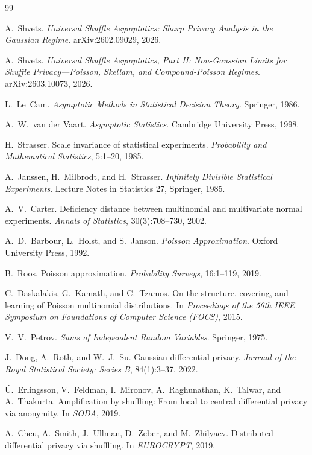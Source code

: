 \documentclass{article}
\newcommand{\1}{\mathbf 1}
\begin{document}
\begingroup
\sloppy
{}
\begin{thebibliography}{99}

A.~Shvets.
\textit{Universal Shuffle Asymptotics: Sharp Privacy Analysis in the Gaussian Regime}.
arXiv:2602.09029, 2026.

A.~Shvets.
\textit{Universal Shuffle Asymptotics, Part II: Non-Gaussian Limits for Shuffle Privacy---Poisson, Skellam, and Compound-Poisson Regimes}.
arXiv:2603.10073, 2026.

L.~Le~Cam.
\textit{Asymptotic Methods in Statistical Decision Theory}.
Springer, 1986.

A.~W.~van der Vaart.
\textit{Asymptotic Statistics}.
Cambridge University Press, 1998.

H.~Strasser.
Scale invariance of statistical experiments.
\textit{Probability and Mathematical Statistics}, 5:1--20, 1985.

A.~Janssen, H.~Milbrodt, and H.~Strasser.
\textit{Infinitely Divisible Statistical Experiments}.
Lecture Notes in Statistics 27, Springer, 1985.

A.~V.~Carter.
Deficiency distance between multinomial and multivariate normal experiments.
\textit{Annals of Statistics}, 30(3):708--730, 2002.

A.~D.~Barbour, L.~Holst, and S.~Janson.
\textit{Poisson Approximation}.
Oxford University Press, 1992.

B.~Roos.
Poisson approximation.
\textit{Probability Surveys}, 16:1--119, 2019.

C.~Daskalakis, G.~Kamath, and C.~Tzamos.
On the structure, covering, and learning of Poisson multinomial distributions.
In \textit{Proceedings of the 56th IEEE Symposium on Foundations of Computer Science (FOCS)}, 2015.

V.~V.~Petrov.
\textit{Sums of Independent Random Variables}.
Springer, 1975.

J.~Dong, A.~Roth, and W.~J.~Su.
Gaussian differential privacy.
\textit{Journal of the Royal Statistical Society: Series B}, 84(1):3--37, 2022.

\'U.~Erlingsson, V.~Feldman, I.~Mironov, A.~Raghunathan, K.~Talwar, and A.~Thakurta.
Amplification by shuffling: From local to central differential privacy via anonymity.
In \textit{SODA}, 2019.

A.~Cheu, A.~Smith, J.~Ullman, D.~Zeber, and M.~Zhilyaev.
Distributed differential privacy via shuffling.
In \textit{EUROCRYPT}, 2019.


\end{thebibliography}
\end{document}
